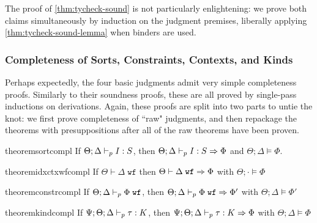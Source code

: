 The proof of \autoref{thm:tycheck-sound} is not particularly enlightening: we prove both claims simultaneously by induction on the judgment premises, liberally applying \autoref{thm:tycheck-sound-lemma} when binders are used.


\subsubsection{Completeness of Sorts, Constraints, Contexts, and Kinds}
Perhaps expectedly, the four basic judgments admit very simple completeness proofs. Similarly to their soundness proofs, these are all proved by single-pass inductions on derivations. Again, these proofs are split into two parts to untie the knot: we first prove completeness of ``raw" judgments, and then repackage the theorems with presuppositions after all of the raw theorems have been proven.


\begin{restatable}{theorem}{sortcompl}
If $\Theta;\Delta \vdash_p I : S$, then $\Theta;\Delta \vdash_p I : S \Rightarrow \Phi$ and $\Theta;\Delta \vDash \Phi$.
\label{thm:sort-compl}
\end{restatable}

\begin{restatable}{theorem}{idxctxwfcompl}
If $\Theta \vdash \Delta \; \texttt{wf}$ then $\Theta \vdash \Delta \; \texttt{wf} \Rightarrow \Phi$ with $\Theta ; \cdot \vDash \Phi$
\label{thm:idx-ctx-wf-compl}
\end{restatable}

\begin{restatable}{theorem}{constrcompl}
If $\Theta ; \Delta \vdash_p \Phi \; \texttt{wf}$, then $\Theta ; \Delta \vdash_p \Phi \; \texttt{wf} \Rightarrow \Phi'$ with $\Theta ; \Delta \vDash \Phi'$
\label{thm:constr-compl}
\end{restatable}

\begin{restatable}{theorem}{kindcompl}
If $\Psi;\Theta;\Delta \vdash_p \tau : K$, then $\Psi;\Theta;\Delta \vdash_p \tau : K \Rightarrow \Phi$ with $\Theta ; \Delta \vDash \Phi$
\label{thm:kind-compl}
\end{restatable}

